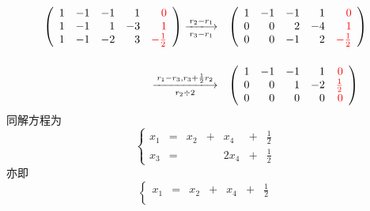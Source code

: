 \begin{frame}[allowframebreaks]
\begin{jie}
  $$
  \begin{array}{rl}
    \left(
    \begin{array}{rrrrr}
      1&-1&-1& 1&\red{0}\\
      1&-1& 1&-3&\red{1}\\
      1&-1&-2& 3&\red{-\frac12}
    \end{array}
                  \right)  \xlongrightarrow[r_3-r_1]{r_2-r_1} &
                                                                \left(
                                                                \begin{array}{rrrrr}
                                                                  1&-1&-1& 1&\red{0}\\
                                                                  0& 0& 2&-4&\red{1}\\
                                                                  0& 0&-1& 2&\red{-\frac12}
                                                                \end{array}
                                                                              \right) \\[0.4in]
    \xlongrightarrow[r_2\div2]{r_1-r_3,r_3+\frac12r_2} &
                                                         \left(
                                                         \begin{array}{rrrrr}
                                                           1&-1&-1& 1&\red{0}\\
                                                           0& 0& 1&-2&\red{\frac12}\\
                                                           0& 0& 0& 0&\red{0}
                                                         \end{array}
                                                                       \right)
  \end{array}
  $$
  同解方程为
  $$
  \left\{
    \begin{array}{rcrcrcr}
      x_1&=&x_2&+&x_4&+&\frac12\\[0.1in]
      x_3&=&&&2x_4&+&\frac12
    \end{array}
  \right.
  $$
  亦即
  $$
  \left\{
    \begin{array}{rcrcrcr}
      x_1&=&x_2&+&x_4&+&\frac12\\[0.1in]

\end{array}$$
\end{jie}
\end{frame}
